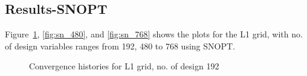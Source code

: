 \subsection{Results-SNOPT}
Figure~\ref{fig:sn_192}, \ref{fig:sn_480}, and \ref{fig:sn_768} shows the plots for the L1 grid, with no. of 
design variables ranges from 192, 480 to 768 using SNOPT. 

\begin{figure}[H]
  \centering
   \caption{Convergence histories for L1 grid, no. of design 192 \label{fig:sn_192}}
\end{figure}


